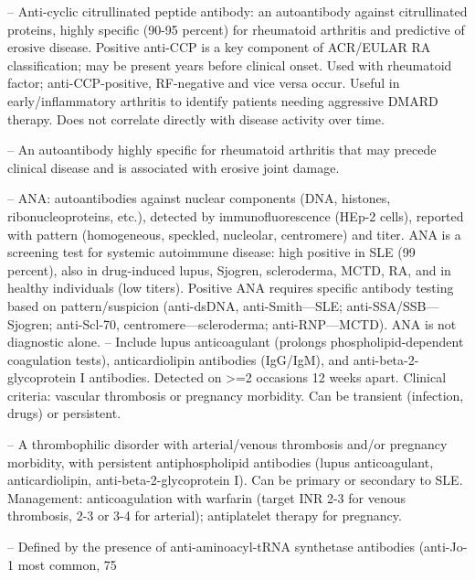 -- Anti-cyclic citrullinated peptide antibody: an autoantibody against citrullinated proteins, highly specific (90-95 percent) for rheumatoid arthritis and predictive of erosive disease. Positive anti-CCP is a key component of ACR/EULAR RA classification; may be present years before clinical onset. Used with rheumatoid factor; anti-CCP-positive, RF-negative and vice versa occur. Useful in early/inflammatory arthritis to identify patients needing aggressive DMARD therapy. Does not correlate directly with disease activity over time.

-- An autoantibody highly specific for rheumatoid arthritis that may precede clinical disease and is associated with erosive joint damage.

-- ANA: autoantibodies against nuclear components (DNA, histones, ribonucleoproteins, etc.), detected by immunofluorescence (HEp-2 cells), reported with pattern (homogeneous, speckled, nucleolar, centromere) and titer. ANA is a screening test for systemic autoimmune disease: high positive in SLE (99 percent), also in drug-induced lupus, Sjogren, scleroderma, MCTD, RA, and in healthy individuals (low titers). Positive ANA requires specific antibody testing based on pattern/suspicion (anti-dsDNA, anti-Smith—SLE; anti-SSA/SSB—Sjogren; anti-Scl-70, centromere—scleroderma; anti-RNP—MCTD). ANA is not diagnostic alone.
-- Include lupus anticoagulant (prolongs phospholipid-dependent coagulation tests), anticardiolipin antibodies (IgG/IgM), and anti-beta-2-glycoprotein I antibodies. Detected on >=2 occasions 12 weeks apart. Clinical criteria: vascular thrombosis or pregnancy morbidity. Can be transient (infection, drugs) or persistent.

-- A thrombophilic disorder with arterial/venous thrombosis and/or pregnancy morbidity, with persistent antiphospholipid antibodies (lupus anticoagulant, anticardiolipin, anti-beta-2-glycoprotein I). Can be primary or secondary to SLE. Management: anticoagulation with warfarin (target INR 2-3 for venous thrombosis, 2-3 or 3-4 for arterial); antiplatelet therapy for pregnancy.

-- Defined by the presence of anti-aminoacyl-tRNA synthetase antibodies (anti-Jo-1 most common, 75%

